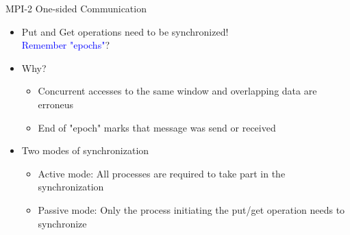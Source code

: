 \documentclass[svgnames]{beamer}
\begin{document}
\begin{frame}{MPI-2 One-sided Communication}
	\begin{itemize}
		\item Put and Get operations need to be synchronized!\\
					\textcolor{blue}{Remember "epochs"}?
		\item Why?
		\begin{itemize}
			\item Concurrent accesses to the same window and overlapping data are erroneus
			\item End of "epoch" marks that message was send or received
		\end{itemize}
		\item Two modes of synchronization
		\begin{itemize}
			\item Active mode: All processes are required to take part in the synchronization
			\item Passive mode: Only the process initiating the put/get operation needs to synchronize
		\end{itemize}
	\end{itemize}
\end{frame}
\end{document}
